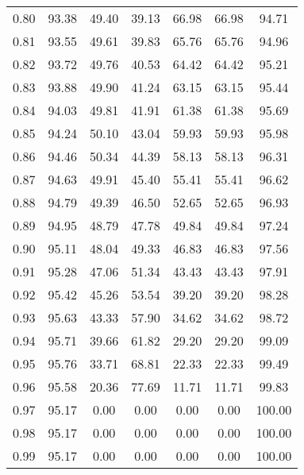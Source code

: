 \begin{tabular}{|c|c|c|c|c|c|c|}
      0.80 &     93.38 &     49.40 &      39.13 &   66.98 &      66.98 &         94.71 \\
      0.81 &     93.55 &     49.61 &      39.83 &   65.76 &      65.76 &         94.96 \\
      0.82 &     93.72 &     49.76 &      40.53 &   64.42 &      64.42 &         95.21 \\
      0.83 &     93.88 &     49.90 &      41.24 &   63.15 &      63.15 &         95.44 \\
      0.84 &     94.03 &     49.81 &      41.91 &   61.38 &      61.38 &         95.69 \\
      0.85 &     94.24 &     50.10 &      43.04 &   59.93 &      59.93 &         95.98 \\
      0.86 &     94.46 &     50.34 &      44.39 &   58.13 &      58.13 &         96.31 \\
      0.87 &     94.63 &     49.91 &      45.40 &   55.41 &      55.41 &         96.62 \\
      0.88 &     94.79 &     49.39 &      46.50 &   52.65 &      52.65 &         96.93 \\
      0.89 &     94.95 &     48.79 &      47.78 &   49.84 &      49.84 &         97.24 \\
      0.90 &     95.11 &     48.04 &      49.33 &   46.83 &      46.83 &         97.56 \\
      0.91 &     95.28 &     47.06 &      51.34 &   43.43 &      43.43 &         97.91 \\
      0.92 &     95.42 &     45.26 &      53.54 &   39.20 &      39.20 &         98.28 \\
      0.93 &     95.63 &     43.33 &      57.90 &   34.62 &      34.62 &         98.72 \\
      0.94 &     95.71 &     39.66 &      61.82 &   29.20 &      29.20 &         99.09 \\
      0.95 &     95.76 &     33.71 &      68.81 &   22.33 &      22.33 &         99.49 \\
      0.96 &     95.58 &     20.36 &      77.69 &   11.71 &      11.71 &         99.83 \\
      0.97 &     95.17 &      0.00 &       0.00 &    0.00 &       0.00 &        100.00 \\
      0.98 &     95.17 &      0.00 &       0.00 &    0.00 &       0.00 &        100.00 \\
      0.99 &     95.17 &      0.00 &       0.00 &    0.00 &       0.00 &        100.00 \\
\bottomrule
\end{tabular}
